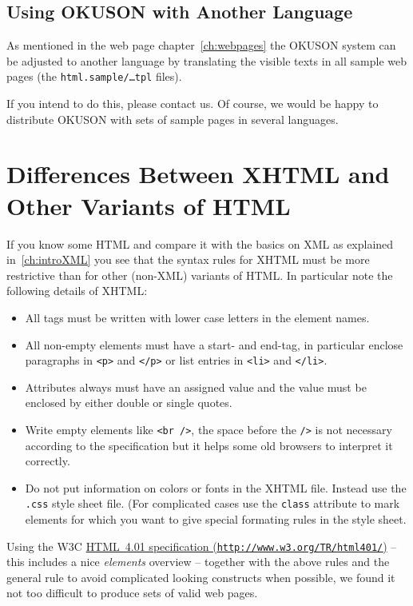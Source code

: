 \documentclass[12pt,openany,a4paper]{book}
\newcommand{\OKUSON}{\textsf{OKUSON}}
\begin{document}
\section{Using {\OKUSON} with Another Language}

As mentioned in the web page chapter~\ref{ch:webpages} the {\OKUSON} system
can be adjusted to another language by translating the visible texts in all
sample web pages (the \texttt{html.sample/\ldots tpl} files). 

If you intend to do this, please contact us. Of course, we would be happy to
distribute {\OKUSON} with sets of sample pages in several languages.


\chapter{Differences Between XHTML and Other Variants of
HTML}\label{ch:diffHTMLXHTML}

If you know some HTML and compare it with the basics on XML as explained
in~\ref{ch:introXML} you see that the syntax rules for XHTML must be more
restrictive than for other (non-XML) variants of HTML. In particular note
the following details of XHTML:

\begin{itemize}
\item All tags must be written with lower case letters in the element names.
\item All non-empty elements must have a start- and end-tag, in particular
enclose paragraphs in \texttt{<p>} and \texttt{</p>} or list entries in
\texttt{<li>} and \texttt{</li>}.
\item Attributes always must have an assigned value and the value must be
enclosed by either double or single quotes.
\item Write empty elements like \texttt{<br />}, the space before the
\texttt{/>} is not necessary according to the specification but it helps
some old browsers to interpret it correctly.
\item Do not put information on colors or fonts in the XHTML file. Instead
use the \texttt{.css} style sheet file. (For complicated cases use the
\texttt{class} attribute to mark elements for which you want to give special
formating rules in the style sheet.
\end{itemize}

Using the W3C \href{http://www.w3.org/TR/html401/}{HTML~4.01 specification
(\texttt{http://www.w3.org/TR/html401/})} -- this includes a nice
\emph{elements} overview -- together with the above rules and the general rule
to avoid complicated looking constructs when possible, we found it not too
difficult to produce sets of valid web pages.
\end{document}
